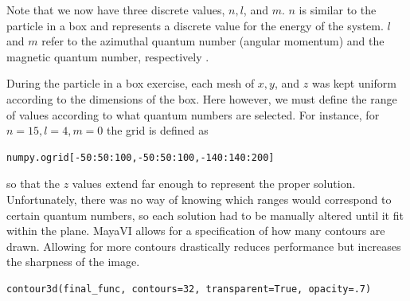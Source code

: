 \documentclass[11pt]{article}
\begin{document}
\noindent Note that we now have three discrete values, $n, l$, and $m$. $n$ is similar to the particle in a box and represents a discrete value for the energy of the system. $l$ and $m$ refer to the azimuthal quantum number (angular momentum) and the magnetic quantum number, respectively \cite{quantum}. 

During the particle in a box exercise, each mesh of $x, y$, and $z$ was kept uniform according to the dimensions of the box. Here however, we must define the range of values according to what quantum numbers are selected. For instance, for $n = 15, l = 4, m = 0$ the grid is defined as 

\begin{verbatim}
numpy.ogrid[-50:50:100,-50:50:100,-140:140:200]
\end{verbatim}

\noindent so that the $z$ values extend far enough to represent the proper solution. Unfortunately, there was no way of knowing which ranges would correspond to certain quantum numbers, so each solution had to be manually altered until it fit within the plane. MayaVI allows for a specification of how many contours are drawn. Allowing for more contours drastically reduces performance but increases the sharpness of the image.

\begin{verbatim}
contour3d(final_func, contours=32, transparent=True, opacity=.7)
\end{verbatim}
\end{document}
